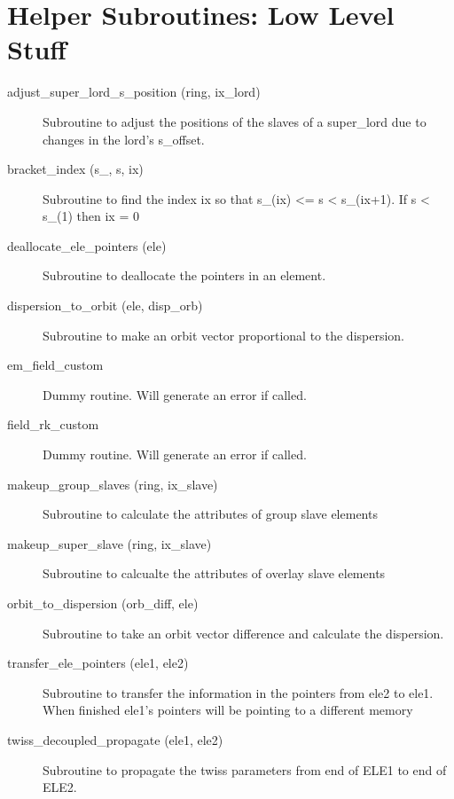 \section{Helper Subroutines: Low Level Stuff}
\label{r:low_help} 

\begin{description}

\item[adjust\_super\_lord\_s\_position (ring, ix\_lord)] \Newline
Subroutine to adjust the positions of the slaves of a super\_lord due to changes in the lord's s\_offset. 

\item[bracket\_index (s\_, s, ix)] \Newline
Subroutine to find the index ix so that s\_(ix) <= s < s\_(ix+1). If s < s\_(1) then ix = 0 

\item[deallocate\_ele\_pointers (ele)] \Newline
Subroutine to deallocate the pointers in an element. 

\item[dispersion\_to\_orbit (ele, disp\_orb)] \Newline
Subroutine to make an orbit vector proportional to the dispersion. 

\item[em\_field\_custom] \Newline
Dummy routine. Will generate an error if called. 

\item[field\_rk\_custom] \Newline
Dummy routine. Will generate an error if called. 

\item[makeup\_group\_slaves (ring, ix\_slave)] \Newline
Subroutine to calculate the attributes of group slave elements 

\item[makeup\_super\_slave (ring, ix\_slave)] \Newline
Subroutine to calcualte the attributes of overlay slave elements 

\item[orbit\_to\_dispersion (orb\_diff, ele)] \Newline
Subroutine to take an orbit vector difference and calculate the dispersion. 

\item[transfer\_ele\_pointers (ele1, ele2)] \Newline
Subroutine to transfer the information in the pointers from ele2 to ele1. When finished ele1's pointers will be pointing to a different memory 

\item[twiss\_decoupled\_propagate (ele1, ele2)] \Newline
Subroutine to propagate the twiss parameters from end of ELE1 to end of ELE2. 

\end{description}

